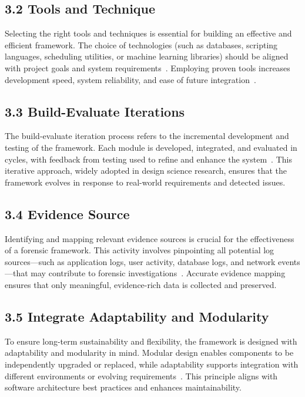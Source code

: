 \subsection{3.2 Tools and Technique}

Selecting the right tools and techniques is essential for building an effective and efficient framework. The choice of technologies (such as databases, scripting languages, scheduling utilities, or machine learning libraries) should be aligned with project goals and system requirements~\cite{saunders2019researchmethods}. Employing proven tools increases development speed, system reliability, and ease of future integration~\cite{pressman2015software}.

\subsection{3.3 Build-Evaluate Iterations}

The build-evaluate iteration process refers to the incremental development and testing of the framework. Each module is developed, integrated, and evaluated in cycles, with feedback from testing used to refine and enhance the system~\cite{hevner2004design}. This iterative approach, widely adopted in design science research, ensures that the framework evolves in response to real-world requirements and detected issues.

\subsection{3.4 Evidence Source}

Identifying and mapping relevant evidence sources is crucial for the effectiveness of a forensic framework. This activity involves pinpointing all potential log sources—such as application logs, user activity, database logs, and network events—that may contribute to forensic investigations~\cite{casey2011digitalforensics}. Accurate evidence mapping ensures that only meaningful, evidence-rich data is collected and preserved.

\subsection{3.5 Integrate Adaptability and Modularity}

To ensure long-term sustainability and flexibility, the framework is designed with adaptability and modularity in mind. Modular design enables components to be independently upgraded or replaced, while adaptability supports integration with different environments or evolving requirements~\cite{bass2012softwarearch}. This principle aligns with software architecture best practices and enhances maintainability.

